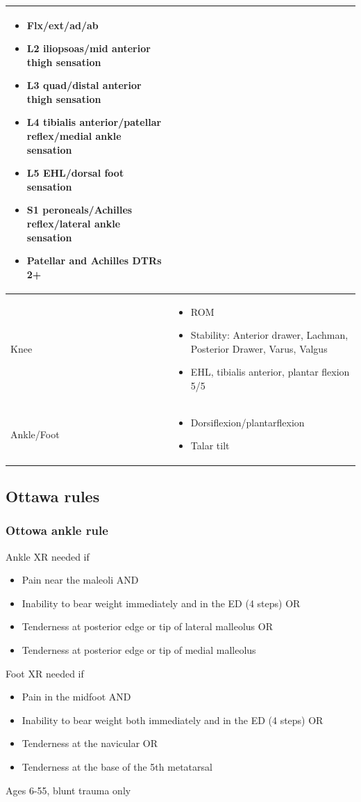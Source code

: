 \documentclass[8pt]{extarticle}
\begin{document}
\begin{tabularx}{\linewidth}{|X|X|}
\begin{itemize}[leftmargin=*]
        \item[] Flx/ext/ad/ab
        \item[] L2 iliopsoas/mid anterior thigh sensation
        \item[] L3 quad/distal anterior thigh sensation
        \item[] L4 tibialis anterior/patellar reflex/medial ankle sensation
        \item[] L5 EHL/dorsal foot sensation
        \item[] S1 peroneals/Achilles reflex/lateral ankle sensation
        \item[] Patellar and Achilles DTRs 2+
    \end{itemize}\\
\hline
Knee & 
    \begin{itemize}[leftmargin=*]
        \item[] ROM
        \item[] Stability: Anterior drawer, Lachman, Posterior Drawer, Varus, Valgus
        \item[] EHL, tibialis anterior, plantar flexion 5/5
    \end{itemize}\\
\hline
Ankle/Foot & 
    \begin{itemize}[leftmargin=*]
        \item[] Dorsiflexion/plantarflexion
        \item[] Talar tilt
    \end{itemize}\\
\hline
\end{tabularx}

\subsection{Ottawa rules}
\subsubsection{Ottowa ankle rule}
Ankle XR needed if
    \begin{itemize}
        \item Pain near the maleoli AND
        \item Inability to bear weight immediately and in the ED (4 steps) OR
        \item Tenderness at posterior edge or tip of lateral malleolus OR
        \item Tenderness at posterior edge or tip of medial malleolus
    \end{itemize}
Foot XR needed if
    \begin{itemize}
        \item Pain in the midfoot AND
        \item Inability to bear weight both immediately and in the ED (4 steps) OR
        \item Tenderness at the navicular OR
        \item Tenderness at the base of the 5th metatarsal
    \end{itemize}
Ages 6-55, blunt trauma only
\end{document}
